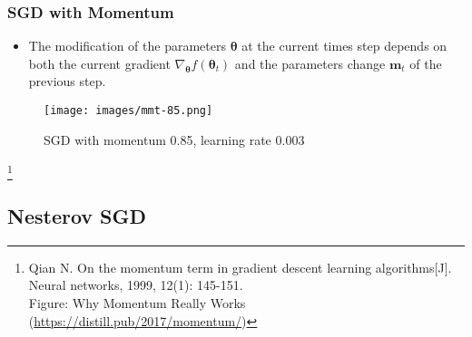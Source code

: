 \documentclass[10pt]{beamer}
\theoremstyle{mystyle}
\def\bb#1{\mathbf{#1}}
\newcommand{\bst}{\boldsymbol\theta}
\newcommand\blfootnote[1]{%
  \begingroup
  \renewcommand\thefootnote{}\footnote[frame]{#1}%
  \addtocounter{footnote}{-1}%
  \endgroup
}
\theoremstyle{mystyle}
\begin{document}
\begin{frame}
	\frametitle{SGD with Momentum}
	\begin{itemize}
		\item The modification of the parameters $\bst$ at the current times step depends on both the current gradient $\nabla_{\bst}f(\bst_t)$ and the parameters change $\bb m_t$ of the previous step. 
	\end{itemize}

	\begin{figure}[H]
		\centering
		\texttt{[image: images/mmt-85.png]}
		\caption{SGD with momentum 0.85, learning rate 0.003}
	\end{figure}
	
	\blfootnote{Qian N. On the momentum term in gradient descent learning algorithms[J]. Neural networks, 1999, 12(1): 145-151.\\
	Figure: Why Momentum Really Works (\url{https://distill.pub/2017/momentum/})}
\end{frame}

\subsection{Nesterov SGD}
\end{document}
